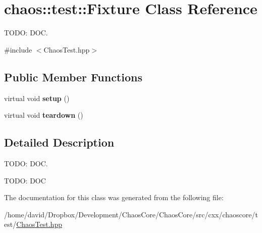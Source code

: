 \hypertarget{classchaos_1_1test_1_1_fixture}{\section{chaos\-:\-:test\-:\-:Fixture Class Reference}
\label{classchaos_1_1test_1_1_fixture}
}


T\-O\-D\-O\-: D\-O\-C.  




{\ttfamily \#include $<$Chaos\-Test.\-hpp$>$}

\subsection*{Public Member Functions}
\begin{DoxyCompactItemize}
\item 
\hypertarget{classchaos_1_1test_1_1_fixture_a24819cdf1af94789cb66a95f736f53c5}{virtual void {\bfseries setup} ()}\label{classchaos_1_1test_1_1_fixture_a24819cdf1af94789cb66a95f736f53c5}

\item 
\hypertarget{classchaos_1_1test_1_1_fixture_ae8ea21c5226a988b64f0b2d166bc4a5e}{virtual void {\bfseries teardown} ()}\label{classchaos_1_1test_1_1_fixture_ae8ea21c5226a988b64f0b2d166bc4a5e}

\end{DoxyCompactItemize}


\subsection{Detailed Description}
T\-O\-D\-O\-: D\-O\-C. 

T\-O\-D\-O\-: D\-O\-C 

The documentation for this class was generated from the following file\-:\begin{DoxyCompactItemize}
\item 
/home/david/\-Dropbox/\-Development/\-Chaos\-Core/\-Chaos\-Core/src/cxx/chaoscore/test/\hyperlink{_chaos_test_8hpp}{Chaos\-Test.\-hpp}\end{DoxyCompactItemize}
